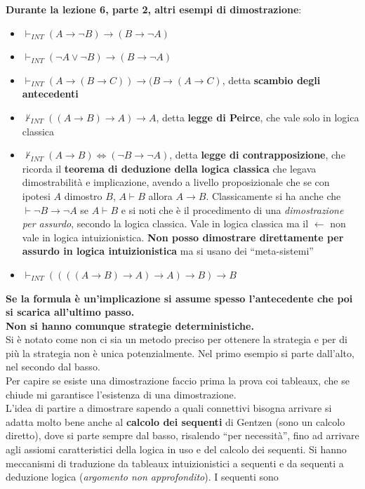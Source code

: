 \documentclass[a4paper,12pt, oneside]{book}
\begin{document}
\noindent
\textbf{Durante la lezione 6, parte 2, altri esempi di dimostrazione}:
\begin{itemize}
  \item $\vdash_{INT}(A\to\neg B)\to(B\to \neg A)$
  \item $\vdash_{INT}(\neg A\lor\neg B)\to(B\to \neg A)$
  \item $\vdash_{INT}(A\to(B\to C))\to(B\to(A\to C)$, detta \textbf{scambio
    degli antecedenti}  
  \item $\nvdash_{INT} ((A\to B)\to A)\to A$, detta \textbf{legge di Peirce},
  che vale solo in logica classica
  \item $\nvdash_{INT}(A\to B)\iff(\neg B\to \neg A)$, detta \textbf{legge di
    contrapposizione}, che ricorda il\textbf{ teorema di deduzione della logica
    classica} che legava dimostrabilità e implicazione, avendo a livello
  proposizionale che se con ipotesi $A$ dimostro $B$, $A\vdash B$ allora $A\to
  B$. Classicamente si ha anche che $\vdash \neg B\to \neg A$ se $A\vdash B$ e
  si noti che è il procedimento di una \textit{dimostrazione per assurdo},
  secondo la logica classica. Vale in logica classica ma il $\gets$ non vale in
  logica intuizionistica. \textbf{Non posso dimostrare direttamente per assurdo
    in logica intuizionistica} ma si usano dei ``meta-sistemi''
  \item $\vdash_{INT}((((A\to B)\to A)\to A)\to B)\to B$
\end{itemize}
\textbf{Se la formula è un'implicazione si assume spesso l'antecedente che poi
  si scarica all'ultimo passo.} \\
\textbf{Non si hanno comunque strategie deterministiche.}\\
Si è notato come non ci sia un metodo preciso per ottenere la strategia e per di
più la strategia non è unica potenzialmente. Nel primo esempio si parte
dall'alto, nel secondo dal basso.\\
Per capire se esiste una dimostrazione faccio prima la prova coi tableaux, che
se chiude mi garantisce l'esistenza di una dimostrazione.\\
L'idea di partire a dimostrare sapendo a quali connettivi bisogna arrivare si
adatta molto bene anche al \textbf{calcolo dei sequenti} di Gentzen (sono un
calcolo diretto), dove si
parte sempre dal basso, risalendo ``per necessità'', fino ad arrivare agli
assiomi caratteristici della logica in uso e del calcolo dei sequenti. Si hanno
meccanismi di traduzione da tableaux intuizionistici a sequenti e da sequenti a
deduzione logica (\textit{argomento non approfondito}). I sequenti sono
\end{document}
